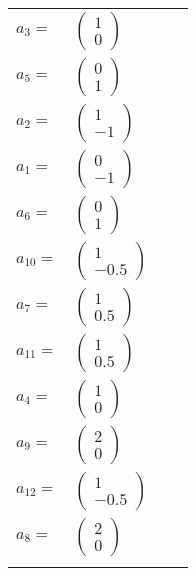 \documentclass[1p]{elsarticle_modified}
\theoremstyle{definition}
\begin{document}
\begin{tabular}{m{7pt} m{180pt} m{7pt} m{180pt} }
\flushright $a_{3}=$&$\begin{pmatrix}1\\0\end{pmatrix}$ \\
\flushright $a_{5}=$&$\begin{pmatrix}0\\1\end{pmatrix}$ \\
\flushright $a_{2}=$&$\begin{pmatrix}1\\-1\end{pmatrix}$ \\
\flushright $a_{1}=$&$\begin{pmatrix}0\\-1\end{pmatrix}$ \\
\flushright $a_{6}=$&$\begin{pmatrix}0\\1\end{pmatrix}$ \\
\flushright $a_{10}=$&$\begin{pmatrix}1\\-0.5\end{pmatrix}$ \\
\flushright $a_{7}=$&$\begin{pmatrix}1\\0.5\end{pmatrix}$ \\
\flushright $a_{11}=$&$\begin{pmatrix}1\\0.5\end{pmatrix}$ \\
\flushright $a_{4}=$&$\begin{pmatrix}1\\0\end{pmatrix}$ \\
\flushright $a_{9}=$&$\begin{pmatrix}2\\0\end{pmatrix}$ \\
\flushright $a_{12}=$&$\begin{pmatrix}1\\-0.5\end{pmatrix}$ \\
\flushright $a_{8}=$&$\begin{pmatrix}2\\0\end{pmatrix}$\\&\end{tabular}
\end{document}

